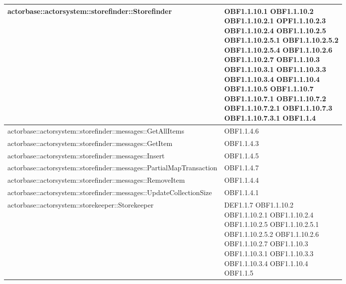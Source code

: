 \documentclass{scalatekids-article}
\begin{document}
\begin{longtable}[H]{|p{11.5cm}|p{5.5cm}|}
\hline
actorbase::actorsystem::storefinder::Storefinder & \multiLineCell[t]{OBF1.1.10.1 OBF1.1.10.2\\OBF1.1.10.2.1 OPF1.1.10.2.3\\OBF1.1.10.2.4 OBF1.1.10.2.5\\OBF1.1.10.2.5.1 OBF1.1.10.2.5.2\\OBF1.1.10.2.5.4 OBF1.1.10.2.6\\OBF1.1.10.2.7 OBF1.1.10.3\\OBF1.1.10.3.1 OBF1.1.10.3.3\\OBF1.1.10.3.4 OBF1.1.10.4\\OBF1.1.10.5 OBF1.1.10.7\\OBF1.1.10.7.1 OBF1.1.10.7.2\\OBF1.1.10.7.2.1 OBF1.1.10.7.3\\OBF1.1.10.7.3.1 OBF1.1.4\\}\\
\hline
actorbase::actorsystem::storefinder::messages::GetAllItems & \multiLineCell[t]{OBF1.1.4.6\\}\\
\hline
actorbase::actorsystem::storefinder::messages::GetItem & \multiLineCell[t]{OBF1.1.4.3\\}\\
\hline
actorbase::actorsystem::storefinder::messages::Insert & \multiLineCell[t]{OBF1.1.4.5\\}\\
\hline
actorbase::actorsystem::storefinder::messages::PartialMapTransaction & \multiLineCell[t]{OBF1.1.4.7\\}\\
\hline
actorbase::actorsystem::storefinder::messages::RemoveItem & \multiLineCell[t]{OBF1.1.4.4\\}\\
\hline
actorbase::actorsystem::storefinder::messages::UpdateCollectionSize & \multiLineCell[t]{OBF1.1.4.1\\}\\
\hline
actorbase::actorsystem::storekeeper::Storekeeper & \multiLineCell[t]{DEF1.1.7 OBF1.1.10.2\\OBF1.1.10.2.1 OBF1.1.10.2.4\\OBF1.1.10.2.5 OBF1.1.10.2.5.1\\OBF1.1.10.2.5.2 OBF1.1.10.2.6\\OBF1.1.10.2.7 OBF1.1.10.3\\OBF1.1.10.3.1 OBF1.1.10.3.3\\OBF1.1.10.3.4 OBF1.1.10.4\\OBF1.1.5}\\

\end{longtable}
\end{document}
